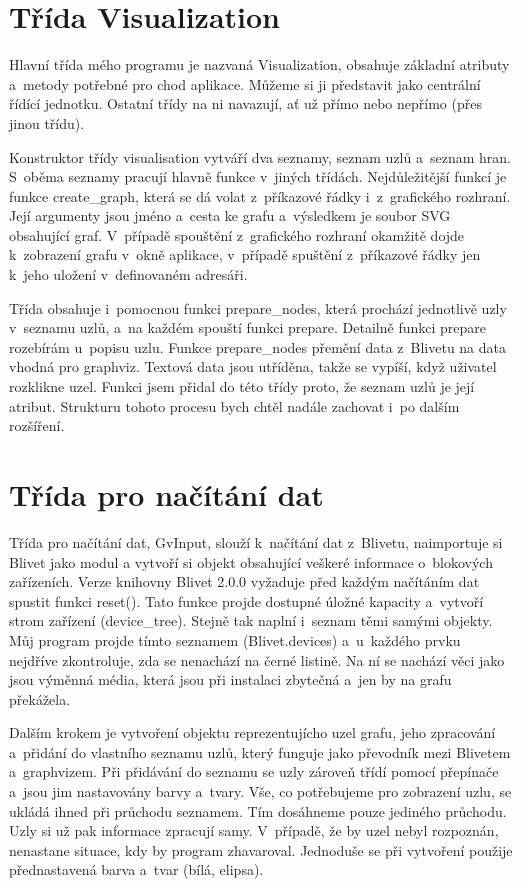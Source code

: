 \documentclass[color,table,oneside,nolot,nolof]{fithesis}
\begin{document}
\section{Třída Visualization}
	Hlavní třída mého programu je nazvaná Visualization, obsahuje základní atributy a~metody potřebné pro chod aplikace. Můžeme si ji představit jako centrální řídící jednotku. Ostatní
	třídy na ni navazují, ať už přímo nebo nepřímo (přes jinou třídu). 

	Konstruktor třídy visualisation vytváří dva seznamy, seznam uzlů a~seznam hran. S~oběma seznamy pracují hlavně funkce v~jiných třídách. Nejdůležitější funkcí
	je funkce create\_graph, která se dá volat z~příkazové řádky i~z~grafického rozhraní. Její argumenty jsou jméno a~cesta ke grafu a~výsledkem je soubor SVG obsahující graf. 
	V~případě spouštění z~grafického rozhraní okamžitě dojde k~zobrazení grafu v~okně aplikace, v~případě spuštění z~příkazové řádky jen k~jeho uložení v~definovaném adresáři. 

	Třída obsahuje i~pomocnou funkci prepare\_nodes, která prochází jednotlivě uzly v~seznamu uzlů, a~na každém spouští funkci prepare. Detailně funkci prepare rozebírám u~popisu uzlu. Funkce prepare\_nodes
	přemění data z~Blivetu na data vhodná pro graphviz. Textová data jsou utříděna, takže se vypíší, když uživatel rozklikne uzel. Funkci jsem přidal do této třídy proto, že 
	seznam uzlů je její atribut. Strukturu tohoto procesu bych chtěl nadále zachovat i~po dalším rozšíření.  

\section{Třída pro načítání dat}
	Třída pro načítání dat, GvInput, slouží k~načítání dat z~Blivetu, naimportuje si Blivet jako modul a vytvoří si objekt obsahující veškeré informace
	o~blokových zařízeních. Verze knihovny Blivet 2.0.0 vyžaduje před 
	každým načítáním dat spustit funkci reset(). Tato funkce projde dostupné úložné kapacity a~vytvoří strom zařízení (device\_tree). Stejně tak naplní i~seznam těmi
	samými objekty. Můj program projde tímto seznamem (Blivet.devices) a~u~každého prvku nejdříve zkontroluje, zda se nenachází na černé listině. Na ní se nachází věci jako jsou 
	výměnná média, která jsou při instalaci zbytečná a~jen by na grafu překážela.

	Dalším krokem je vytvoření objektu reprezentujícho uzel grafu, jeho zpracování a~přidání do vlastního seznamu uzlů, který funguje jako převodník mezi Blivetem a~graphvizem. Při
	přidávání do seznamu se uzly zároveň třídí pomocí přepínače a~jsou jim nastavovány barvy a~tvary. Vše, co potřebujeme pro zobrazení uzlu, se ukládá ihned při průchodu seznamem. 
	Tím dosáhneme pouze jediného průchodu. Uzly si už pak informace zpracují samy. V~případě, že by uzel nebyl rozpoznán, nenastane situace, kdy by program 
	zhavaroval. Jednoduše 
	se při vytvoření použije přednastavená barva a~tvar (bílá, elipsa).
\end{document}
